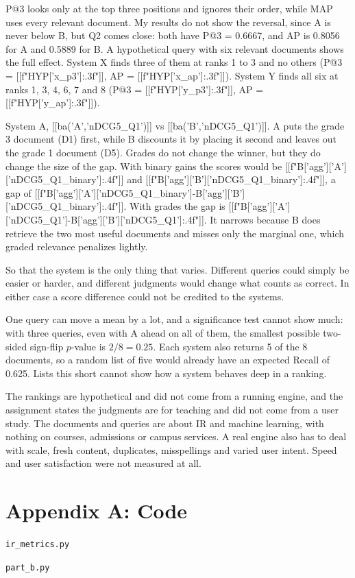 P@3 looks only at the top three positions and ignores their order, while MAP uses every relevant document. My results do not show the reversal, since A is never below B, but Q2 comes close: both have P@3 = 0.6667, and AP is 0.8056 for A and 0.5889 for B. A hypothetical query with six relevant documents shows the full effect. System X finds three of them at ranks 1 to 3 and no others (P@3 = [[f"{HYP['x_p3']:.3f}"]], AP = [[f"{HYP['x_ap']:.3f}"]]). System Y finds all six at ranks 1, 3, 4, 6, 7 and 8 (P@3 = [[f"{HYP['y_p3']:.3f}"]], AP = [[f"{HYP['y_ap']:.3f}"]]).

System A, [[ba('A','nDCG5_Q1')]] vs [[ba('B','nDCG5_Q1')]]. A puts the grade 3 document (D1) first, while B discounts it by placing it second and leaves out the grade 1 document (D5). Grades do not change the winner, but they do change the size of the gap. With binary gains the scores would be [[f"{B['agg']['A']['nDCG5_Q1_binary']:.4f}"]] and [[f"{B['agg']['B']['nDCG5_Q1_binary']:.4f}"]], a gap of [[f"{B['agg']['A']['nDCG5_Q1_binary']-B['agg']['B']['nDCG5_Q1_binary']:.4f}"]]. With grades the gap is [[f"{B['agg']['A']['nDCG5_Q1']-B['agg']['B']['nDCG5_Q1']:.4f}"]]. It narrows because B does retrieve the two most useful documents and misses only the marginal one, which graded relevance penalizes lightly.

So that the system is the only thing that varies. Different queries could simply be easier or harder, and different judgments would change what counts as correct. In either case a score difference could not be credited to the systems.

One query can move a mean by a lot, and a significance test cannot show much: with three queries, even with A ahead on all of them, the smallest possible two-sided sign-flip $p$-value is $2/8=0.25$. Each system also returns 5 of the 8 documents, so a random list of five would already have an expected Recall of 0.625. Lists this short cannot show how a system behaves deep in a ranking.

The rankings are hypothetical and did not come from a running engine, and the assignment states the judgments are for teaching and did not come from a user study. The documents and queries are about IR and machine learning, with nothing on courses, admissions or campus services. A real engine also has to deal with scale, fresh content, duplicates, misspellings and varied user intent. Speed and user satisfaction were not measured at all.

\clearpage\appendix\section*{Appendix A: Code}
\texttt{ir\_metrics.py}

\texttt{part\_b.py}


